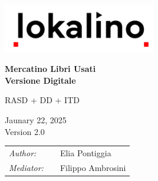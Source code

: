 
\begin{titlepage}
    \begin{center}
        \includegraphics[width=0.5\textwidth]{assets/logo.png}

        \vspace*{2cm}
        \textbf{\huge Mercatino Libri Usati}\\
        \vspace{0.5cm}
        \textbf{\huge Versione Digitale}

        \vspace{0.5cm}
        \LARGE RASD + DD + ITD

        \vspace{1.5cm}

        \vspace{0.5cm}
        Jaunary 22, 2025\\
        Version 2.0

        \vspace{1cm}
        \small
        \begin{table}[b]
            \centering
            \begin{tabular}{l p{.5cm} l}
                \textit{Author:}   &  & Elia Pontiggia    \\
                \textit{Mediator:} &  & Filippo Ambrosini
            \end{tabular}
        \end{table}

    \end{center}
\end{titlepage}